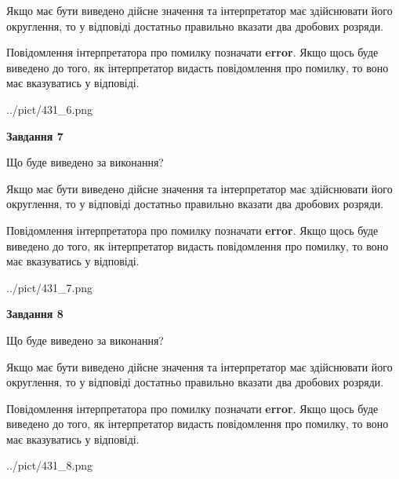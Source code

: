 \documentclass[12pt, ukrainian]{article}
\begin{document}
{\begin {Large}
Якщо має бути виведено дійсне значення та інтерпретатор має здійснювати його округлення, 
то у відповіді достатньо правильно вказати два дробових розряди.

Повідомлення інтерпретатора про помилку позначати \textbf{error}.
Якщо щось буде виведено до того, як інтерпретатор видасть повідомлення про помилку, 
то воно має вказуватись у відповіді. \par

\begin{center}
	{../pict/431_6.png}
\end{center}
\newpage

{\begin {center}\textbf{Завдання 7}\end {center}}\par
Що буде виведено за виконання? \par

Якщо має бути виведено дійсне значення та інтерпретатор має здійснювати його округлення, 
то у відповіді достатньо правильно вказати два дробових розряди.

Повідомлення інтерпретатора про помилку позначати \textbf{error}.
Якщо щось буде виведено до того, як інтерпретатор видасть повідомлення про помилку, 
то воно має вказуватись у відповіді. \par

\begin{center}
	{../pict/431_7.png}
\end{center}
\newpage

{\begin {center}\textbf{Завдання 8}\end {center}}\par
Що буде виведено за виконання? \par

Якщо має бути виведено дійсне значення та інтерпретатор має здійснювати його округлення, 
то у відповіді достатньо правильно вказати два дробових розряди.

Повідомлення інтерпретатора про помилку позначати \textbf{error}.
Якщо щось буде виведено до того, як інтерпретатор видасть повідомлення про помилку, 
то воно має вказуватись у відповіді. \par

\begin{center}
	{../pict/431_8.png}
\end{center}
\newpage


\end{Large}}
\end{document}

